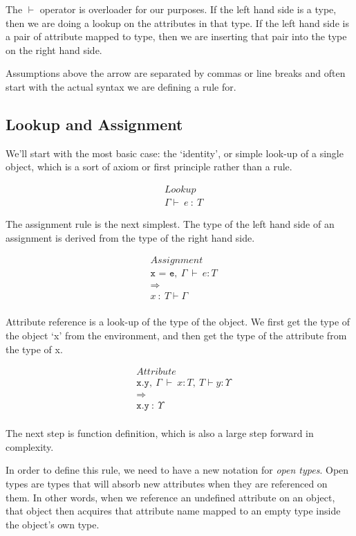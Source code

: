\documentclass{article}
\begin{document}
The $\vdash$ operator is overloader for our purposes. If the left hand side is
a type, then we are doing a lookup on the attributes in that type. If the left
hand side is a pair of attribute mapped to type, then we are inserting that
pair into the type on the right hand side.

Assumptions above the arrow are separated by commas or line breaks and often
start with the actual syntax we are defining a rule for.

\subsection*{Lookup and Assignment}

We'll start with the most basic case: the `identity', or simple look-up of a
single object, which is a sort of axiom or first principle rather than a rule.

\begin{align*}
&Lookup\\
& \Gamma \vdash\ e\ :\ T
\end{align*}

The assignment rule is the next simplest. The type of the left hand side of an
assignment is derived from the type of the right hand side.

\begin{align*}
&Assignment\\
& \texttt{x = e},\ \Gamma\ \vdash\ e:T\\
& \Longrightarrow \\
& x\ :\ T \vdash \Gamma \\
\end{align*}

Attribute reference is a look-up of the type of the object. We first get the
type of the object `x' from the environment, and then get the type of the
attribute from the type of x.

\begin{align*}
&Attribute\\
& \texttt{x.y},\ \Gamma\ \vdash\ x:T,\ T \vdash y:\Upsilon\\
& \Longrightarrow \\
& \texttt{x.y}\ :\ \Upsilon \\
\end{align*}

The next step is function definition, which is also a large step forward in complexity.

In order to define this rule, we need to have a new notation for \emph{open
types}. Open types are types that will absorb new attributes when they
are referenced on them. In other words, when we reference an undefined
attribute on an object, that object then acquires that attribute name mapped to
an empty type inside the object's own type.
\end{document}
